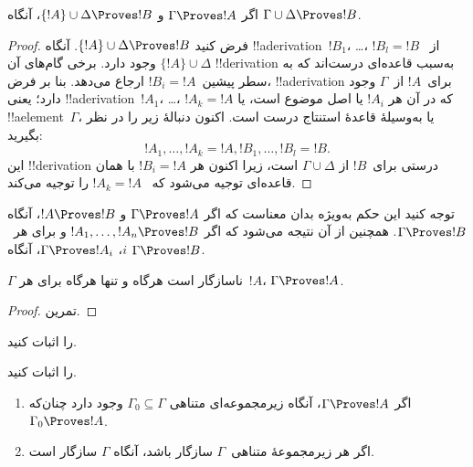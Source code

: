\documentclass[../../../include/open-logic-section]{subfiles}
\begin{document}
\begin{prop}[تعدی]
اگر $\Gamma \Proves !A$ و $\{!A\} \cup \Delta \Proves !B$، آنگاه
$\Gamma \cup \Delta \Proves !B$.
\end{prop}

\begin{proof}
  فرض کنید $\{!A\} \cup \Delta \Proves !B$. آنگاه
  !!a{derivation}~$!B_1$، \dots، $!B_l = !B$ از~$\{!A\} \cup
  \Delta$ وجود دارد. برخی گام‌های آن !!{derivation} به‌سبب قاعده‌ای
  درست‌اند که به سطر پیشین~$!B_i = !A$ ارجاع می‌دهد. بنا بر فرض،
  !!a{derivation} برای~$!A$ از~$\Gamma$ وجود دارد؛ یعنی
  !!a{derivation}~$!A_1$، \dots، $!A_k = !A$ که در آن هر $!A_i$ یا
  اصل موضوع است، یا !!a{element}~$\Gamma$، یا به‌وسیلهٔ قاعدهٔ استنتاج
  درست است. اکنون دنبالهٔ زیر را در نظر بگیرید:
  \[
  !A_1, \dots, !A_k = !A, !B_1, \dots, !B_l = !B.
  \]
  این !!{derivation} درستی برای~$!B$ از $\Gamma \cup \Delta$ است، زیرا
  اکنون هر $!B_i = !A$ با همان قاعده‌ای توجیه می‌شود که
  ~$!A_k = !A$ را توجیه می‌کند.
\end{proof}

توجه کنید این حکم به‌ویژه بدان معناست که اگر $\Gamma \Proves !A$ و
$!A \Proves !B$، آنگاه $\Gamma \Proves !B$. همچنین از آن نتیجه می‌شود
که اگر $!A_1, \dots, !A_n \Proves !B$ و برای هر~$i$،
$\Gamma \Proves !A_i$، آنگاه $\Gamma \Proves !B$.

\begin{prop}
$\Gamma$ ناسازگار است هرگاه و تنها هرگاه برای هر~$!A$،
$\Gamma \Proves !A$.
\end{prop}

\begin{proof}
تمرین.
\end{proof}

\begin{prob}
 را اثبات کنید.
\end{prob}
\tagendprob

\begin{prob}
 را اثبات کنید.
\end{prob}
\tagendprob

\begin{prop}[فشردگی]
  \begin{enumerate}
  \item اگر $\Gamma \Proves !A$، آنگاه زیرمجموعه‌ای متناهی
    $\Gamma_0 \subseteq \Gamma$ وجود دارد چنان‌که
    $\Gamma_0 \Proves !A$.
  \item اگر هر زیرمجموعهٔ متناهی~$\Gamma$ سازگار باشد، آنگاه $\Gamma$
    سازگار است.
  \end{enumerate}
\end{prop}
\end{document}
